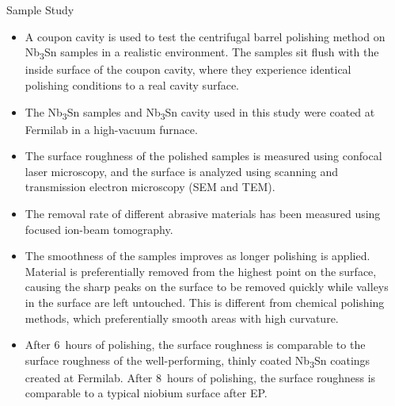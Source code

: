 \documentclass{beamer}
\begin{document}
\begin{frame}{}
\begin{columns}[t]
\begin{column}{0.32\linewidth}
\begin{block}{\label{sec:samplestudy}Sample Study}
                    \begin{itemize}                        
                        \item A coupon cavity is used to test the centrifugal barrel polishing method on Nb\textsubscript{3}Sn samples in a realistic environment. The samples sit flush with the inside surface of the coupon cavity, where they experience identical polishing conditions to a real cavity surface.
                        \item The Nb\textsubscript{3}Sn samples and Nb\textsubscript{3}Sn cavity used in this study were coated at Fermilab in a high-vacuum furnace.
                        \item The surface roughness of the polished samples is measured using confocal laser microscopy, and the surface is analyzed using scanning and transmission electron microscopy (SEM and TEM). 
                        \item The removal rate of different abrasive materials has been measured using focused ion-beam tomography.
                        \item The smoothness of the samples improves as longer polishing is applied. Material is preferentially removed from the highest point on the surface, causing the sharp peaks on the surface to be removed quickly while valleys in the surface are left untouched. This is different from chemical polishing methods, which preferentially smooth areas with high curvature.
                        \item After 6~hours of polishing, the surface roughness is comparable to the surface roughness of the well-performing, thinly coated Nb\textsubscript{3}Sn coatings created at Fermilab. After 8~hours of polishing, the surface roughness is comparable to a typical niobium surface after EP.
                    \end{itemize}
                \end{block}
            \end{column}
            \begin{column}{0.32\textwidth}
            \end{column}
        \end{columns}
    \end{frame}
\end{document}
